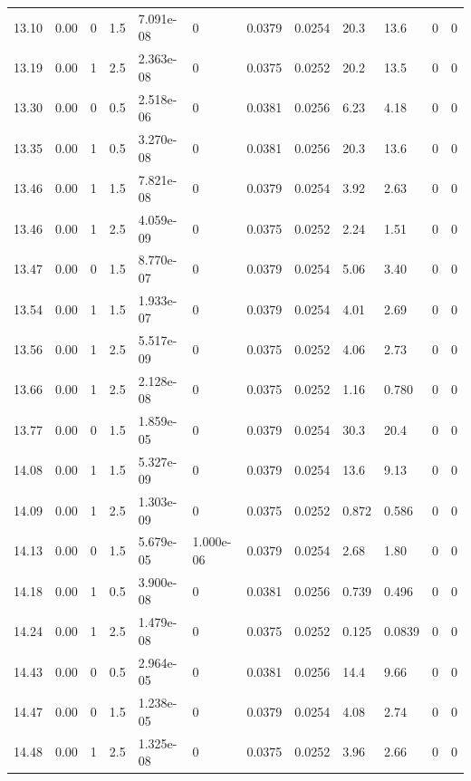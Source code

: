 \documentclass[preview]{standalone}
\begin{document}
{{{{{\begin{tabular}{L{1.2cm}C{1.2cm} C{0.3cm}C{0.5cm} C{1.4cm}C{1.4cm} C{1.4cm}C{1.4cm} C{1.6cm}C{1.6cm} C{1.6cm}C{1.6cm}}
  13.10  &  0.00  & 0     & 1.5 &  7.091e-08  & 0  &  0.0379&   0.0254& 20.3 & 13.6   &  0 & 0  \\ 
  13.19  &  0.00  & 1     & 2.5 &  2.363e-08  & 0  &  0.0375&   0.0252& 20.2 & 13.5   &  0 & 0  \\ 
  13.30  &  0.00  & 0     & 0.5 &  2.518e-06  & 0  &  0.0381&   0.0256& 6.23 & 4.18   &  0 & 0  \\ 
  13.35  &  0.00  & 1     & 0.5 &  3.270e-08  & 0  &  0.0381&   0.0256& 20.3 & 13.6   &  0 & 0  \\ 
  13.46  &  0.00  & 1     & 1.5 &  7.821e-08  & 0  &  0.0379&   0.0254& 3.92 & 2.63   &  0 & 0  \\ 
  13.46  &  0.00  & 1     & 2.5 &  4.059e-09  & 0  &  0.0375&   0.0252& 2.24 & 1.51   &  0 & 0  \\ 
  13.47  &  0.00  & 0     & 1.5 &  8.770e-07  & 0  &  0.0379&   0.0254& 5.06 & 3.40   &  0 & 0  \\ 
  13.54  &  0.00  & 1     & 1.5 &  1.933e-07  & 0  &  0.0379&   0.0254& 4.01 & 2.69   &  0 & 0  \\ 
  13.56  &  0.00  & 1     & 2.5 &  5.517e-09  & 0  &  0.0375&   0.0252& 4.06 & 2.73   &  0 & 0  \\ 
  13.66  &  0.00  & 1     & 2.5 &  2.128e-08  & 0  &  0.0375&   0.0252& 1.16 & 0.780   &  0 & 0  \\ 
  13.77  &  0.00  & 0     & 1.5 &  1.859e-05  & 0  &  0.0379&   0.0254& 30.3 & 20.4   &  0 & 0  \\ 
  14.08  &  0.00  & 1     & 1.5 &  5.327e-09  & 0  &  0.0379&   0.0254& 13.6 & 9.13   &  0 & 0  \\ 
  14.09  &  0.00  & 1     & 2.5 &  1.303e-09  & 0  &  0.0375&   0.0252& 0.872 & 0.586   &  0 & 0  \\ 
  14.13  &  0.00  & 0     & 1.5 &  5.679e-05  & 1.000e-06  &  0.0379&   0.0254& 2.68 & 1.80   &  0 & 0  \\ 
  14.18  &  0.00  & 1     & 0.5 &  3.900e-08  & 0  &  0.0381&   0.0256& 0.739 & 0.496   &  0 & 0  \\ 
  14.24  &  0.00  & 1     & 2.5 &  1.479e-08  & 0  &  0.0375&   0.0252& 0.125 & 0.0839   &  0 & 0  \\ 
  14.43  &  0.00  & 0     & 0.5 &  2.964e-05  & 0  &  0.0381&   0.0256& 14.4 & 9.66   &  0 & 0  \\ 
  14.47  &  0.00  & 0     & 1.5 &  1.238e-05  & 0  &  0.0379&   0.0254& 4.08 & 2.74   &  0 & 0  \\ 
  14.48  &  0.00  & 1     & 2.5 &  1.325e-08  & 0  &  0.0375&   0.0252& 3.96 & 2.66   &  0 & 0  \\ 

\end{tabular}}}}}}
\end{document}
